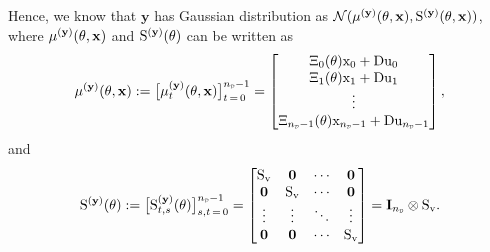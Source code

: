 Hence, we know that $\mathbf{y}$ has  Gaussian distribution as $\mathcal{N}(\mu^{(\mathbf{y})}({ \mathrm{\theta} },\mathbf{x}), { \mathrm{S} }^{(\mathbf{y})}({ \mathrm{\theta} },\mathbf{x}))$,
where 
$\mu^{(\mathbf{y})}({{ \mathrm{\theta} }},\mathbf{x})$ and ${ \mathrm{S} }^{(\mathbf{y})}({{ \mathrm{\theta} }})$ can be written as
\begin{equation}\label{eq:mean y}
        \mu^{(\mathbf{y})}({\vctheta},\mathbf{x}) 
        := 
        \big[
        \mu_t^{(\mathbf{y})}(\vctheta,\mathbf{x})
        \big]_{t\,=\,0}^{\nsD-1}
        =
        \begin{bmatrix}
        \Xi_0(\vctheta) \vcx_0 + \mxD \vcu_0 \\
        \Xi_1(\vctheta) \vcx_1 + \mxD \vcu_1 \\
        \vdots \\
        \Xi_{\nsD-1}(\vctheta) \vcx_{\nsD-1} + \mxD \vcu_{\nsD-1}\\
        \end{bmatrix},
\end{equation}
and
\begin{equation}\label{eq:covariance y}
    \mxS^{(\mathbf{y})}({\vctheta})
    := 
    \big[
    \mxS_{t,s}^{(\mathbf{y})}({\vctheta}) 
    \big]_{s,t\,=\,0}^{\nsD-1}
    =
    \begin{bmatrix}
        \mxS_\vcv & \mathbf{0} & \cdots & \mathbf{0}\\
        \mathbf{0} & \mxS_\vcv & \cdots & \mathbf{0}\\
        \vdots & \vdots & \ddots & \vdots\\
        \mathbf{0} & \mathbf{0} & \cdots & \mxS_\vcv\\
    \end{bmatrix}
    = 
    \mathbf{I}_{\nsD}\otimes \mxS_\vcv.
\end{equation}

